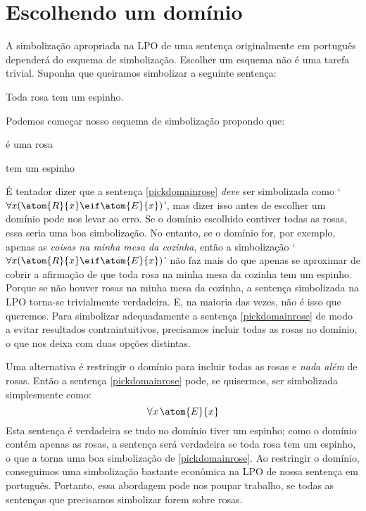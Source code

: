 \section{Escolhendo um domínio}
A simbolização apropriada na LPO de uma sentença originalmente em português dependerá do esquema de simbolização.
Escolher um esquema não é uma tarefa trivial.
Suponha que queiramos simbolizar a seguinte sentença:
	\begin{earg}
		\item[\ex{pickdomainrose}] Toda rosa tem um espinho.
	\end{earg}
Podemos começar nosso esquema de simbolização propondo que:
	\begin{ekey}
		\item[\atom{R}{x}]  é uma rosa
		\item[\atom{E}{x}]  tem um espinho
	\end{ekey}
É tentador dizer que a sentença \ref{pickdomainrose} \emph{deve} ser simbolizada como `$\forall x(\atom{R}{x} \eif \atom{E}{x})$', mas dizer isso antes de escolher um domínio pode nos levar ao erro.
Se o domínio escolhido contiver todas as rosas, essa seria uma boa simbolização. No entanto, se o domínio for, por exemplo, apenas as \emph{coisas na minha mesa da cozinha}, então a simbolização `$\forall x(\atom{R}{x} \eif \atom{E}{x})$' não faz mais do que apenas se aproximar de cobrir a afirmação de que toda rosa na minha mesa da cozinha tem um espinho.
Porque se não houver rosas na minha mesa da cozinha, a sentença simbolizada na LPO torna-se trivialmente verdadeira.
E, na maioria das vezes, não é isso que queremos.
Para simbolizar adequadamente a sentença \ref{pickdomainrose} de modo a evitar resultados contraintuitivos, precisamos incluir todas as rosas no domínio, o que nos deixa com duas opções distintas. 

Uma alternativa é restringir o domínio para incluir todas as rosas e \emph{nada além} de rosas.
Então a sentença \ref{pickdomainrose} pode, se quisermos, ser simbolizada simplesmente como:
$$\forall x\,\atom{E}{x}$$
Esta sentença é verdadeira se tudo no domínio tiver um espinho; como o domínio contém apenas as rosas, a sentença será verdadeira se toda rosa tem um espinho, o que a torna uma boa simbolização de \ref{pickdomainrose}.
Ao restringir o domínio, conseguimos uma simbolização bastante econômica na LPO de nossa sentença em português.
Portanto, essa abordagem pode nos poupar trabalho, se todas as sentenças que precisamos simbolizar forem sobre rosas.

